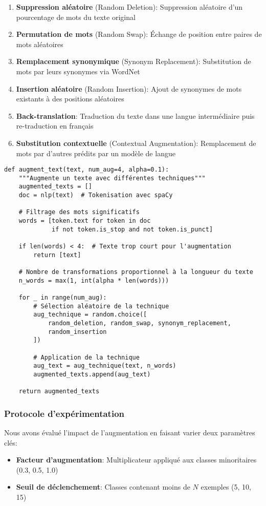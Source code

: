 \documentclass[a4paper,11pt]{article}
\begin{document}
\begin{enumerate}
    \item \textbf{Suppression aléatoire} (Random Deletion): Suppression aléatoire d'un pourcentage de mots du texte original
    \item \textbf{Permutation de mots} (Random Swap): Échange de position entre paires de mots aléatoires
    \item \textbf{Remplacement synonymique} (Synonym Replacement): Substitution de mots par leurs synonymes via WordNet
    \item \textbf{Insertion aléatoire} (Random Insertion): Ajout de synonymes de mots existants à des positions aléatoires
    \item \textbf{Back-translation}: Traduction du texte dans une langue intermédiaire puis re-traduction en français
    \item \textbf{Substitution contextuelle} (Contextual Augmentation): Remplacement de mots par d'autres prédits par un modèle de langue
\end{enumerate}

\begin{lstlisting}[caption={Extrait du code d'augmentation de données}, label=lst:data-aug]
def augment_text(text, num_aug=4, alpha=0.1):
    """Augmente un texte avec différentes techniques"""
    augmented_texts = []
    doc = nlp(text)  # Tokenisation avec spaCy
    
    # Filtrage des mots significatifs
    words = [token.text for token in doc 
             if not token.is_stop and not token.is_punct]
    
    if len(words) < 4:  # Texte trop court pour l'augmentation
        return [text]
    
    # Nombre de transformations proportionnel à la longueur du texte
    n_words = max(1, int(alpha * len(words)))
    
    for _ in range(num_aug):
        # Sélection aléatoire de la technique
        aug_technique = random.choice([
            random_deletion, random_swap, synonym_replacement, 
            random_insertion
        ])
        
        # Application de la technique
        aug_text = aug_technique(text, n_words)
        augmented_texts.append(aug_text)
    
    return augmented_texts
\end{lstlisting}

\subsubsection{Protocole d'expérimentation}
Nous avons évalué l'impact de l'augmentation en faisant varier deux paramètres clés:
\begin{itemize}
    \item \textbf{Facteur d'augmentation}: Multiplicateur appliqué aux classes minoritaires (0.3, 0.5, 1.0)
    \item \textbf{Seuil de déclenchement}: Classes contenant moins de $N$ exemples (5, 10, 15)
\end{itemize}
\end{document}
